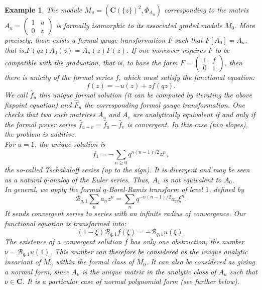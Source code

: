 \documentclass[english]{smfart}
\newtheorem{example}[thm]{Example}
\numberwithin{equation}{thm}
\def\C{{\mathbf C}}
\def\B{{\mathcal{B}}}
\def\Ka{{\C(\{z\})}}
\begin{document}
\begin{example} \label{example:exemple-classique}
The module $M_{u} = (\Ka^{2},\Phi_{A_{u}})$ corresponding to the
matrix $A_{u} = \begin{pmatrix} 1 & u \\ 0 & z \end{pmatrix}$ 
is formally isomorphic to its associated graded module $M_{0}$.
More precisely, there exists a formal gauge transformation $F$ 
such that $F[A_{0}] = A_{u}$, that is,$F(qz) A_{0}(z) = A_{u}(z) F(z)$. 
If one moreover requires $F$ to be compatible with the graduation, that 
is, to have the form $F = \begin{pmatrix} 1 & f \\ 0 & 1 \end{pmatrix}$,
then there is unicity of the formal series $f$, which must satisfy the
functional equation:
$$
f(z) = - u(z) + z f(qz).
$$
We call $\hat{f}_{u}$ this unique formal solution (it can be computed 
by iterating the above fixpoint equation) and $\hat{F}_{u}$ the 
corresponding formal gauge transformation. One checks that two such 
matrices $A_{u}$ and $A_{v}$ are analytically equivalent if and only 
if the formal power series $\hat{f}_{u-v} = \hat{f}_{u} - \hat{f}_{v}$ 
is convergent. In this case (two slopes), the problem is additive. \\

For $u = 1$, the unique solution is 
$$
\hat{f}_{1} = - \sum_{n \geq 0}  q^{n(n-1)/2} z^{n},
$$
the so-called Tschakaloff series (up to the sign). It is divergent 
and may be seen as a natural $q$-analog of the Euler series. Thus,
$A_{1}$ is not equivalent to $A_{0}$. \\

In general, we apply the formal $q$-Borel-Ramis transform of level $1$, 
defined by
$$
\B_{q,1} \sum_{n} a_{n} z^{n} = \sum_{n} q^{-n(n-1)/2} a_{n} \xi^{n}.
$$
It sends convergent series to series with an infinite radius of
convergence. Our functional equation is transformed into:
$$
(1-\xi) \B_{q,1}f(\xi) = - \B_{q,1}u(\xi).
$$
The existence of a convergent solution $f$ has only one obstruction,
the number $\nu = \B_{q,1} u (1)$. This number can therefore be considered 
as the unique analytic invariant of $M_{u}$ within the formal class 
of $M_{0}$. It can
also be considered as giving a normal form, since $A_{\nu}$ is the
unique matrix in the analytic class of $A_{u}$ such that $\nu \in \C$.
It is a particular case of normal polynomial form (see further below). \\


\end{example}
\end{document}

